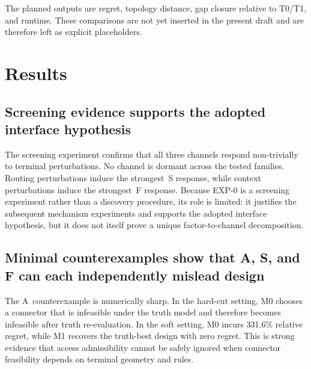 \documentclass[review,authoryear]{elsarticle}
\begin{document}
The planned outputs are regret, topology distance, gap closure relative to T0/T1, and runtime. These comparisons are not yet inserted in the present draft and are therefore left as explicit placeholders.

\begin{table}[htbp]
  \centering
  \caption{Planned external benchmark design: T0, T1, M1, M2, RH, and JO on shared candidate graphs.}
  \label{tab:benchmark}
\end{table}


\section{Results}
\label{sec:results}

\subsection{Screening evidence supports the adopted interface hypothesis}
\label{sec:results:screening}

The screening experiment confirms that all three channels respond non-trivially to terminal perturbations. No channel is dormant across the tested families. Routing perturbations induce the strongest~S response, while context perturbations induce the strongest~F response. Because EXP-0 is a screening experiment rather than a discovery procedure, its role is limited: it justifies the subsequent mechanism experiments and supports the adopted interface hypothesis, but it does not itself prove a unique factor-to-channel decomposition.

\subsection{Minimal counterexamples show that A, S, and F can each independently mislead design}
\label{sec:results:counterexamples}

The A~counterexample is numerically sharp. In the hard-cut setting, M0 chooses a connector that is infeasible under the truth model and therefore becomes infeasible after truth re-evaluation. In the soft setting, M0 incurs 331.6\% relative regret, while M1 recovers the truth-best design with zero regret. This is strong evidence that access admissibility cannot be safely ignored when connector feasibility depends on terminal geometry and rules.
\end{document}
